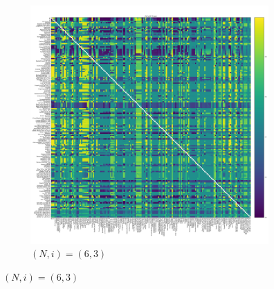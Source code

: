 \documentclass{article}
\begin{document}
\begin{figure}[!hbtp]
    ~
    \begin{subfigure}[t]{.3\textwidth}
        \centering
        \includegraphics[width=.8\textwidth]{../img/fixation_heatmap_6_3_std.pdf}
        \caption{\((N,i)=(6, 3)\)}
    \end{subfigure}%


\end{figure}
\end{document}
